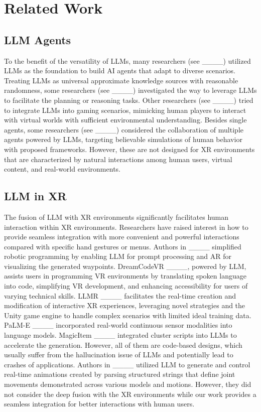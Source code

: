 \section{Related Work}
\label{sec:ref}
\subsection{LLM Agents}
To the benefit of the versatility of LLMs, many researchers (see ____) utilized LLMs as the foundation to build AI agents that adapt to diverse scenarios. Treating LLMs as universal approximate knowledge sources with reasonable randomness, some researchers (see ____) investigated the way to leverage LLMs to facilitate the planning or reasoning tasks. Other researchers (see ____) tried to integrate LLMs into gaming scenarios, mimicking human players to interact with virtual worlds with sufficient environmental understanding. 
Besides single agents, some researchers (see ____) considered the collaboration of multiple agents powered by LLMs, targeting believable simulations of human behavior with proposed frameworks.
However, these are not designed for XR environments that are characterized by natural interactions among human users, virtual content, and real-world environments.


\subsection{LLM in XR}
The fusion of LLM with XR environments significantly facilitates human interaction within XR environments. Researchers have raised interest in how to provide seamless integration with more convenient and powerful interactions compared with specific hand gestures or menus. Authors in ____ simplified robotic programming by enabling LLM for prompt processing and AR for visualizing the generated waypoints. DreamCodeVR ____, powered by LLM, assists users in programming VR environments by translating spoken language into code, simplifying VR development, and enhancing accessibility for users of varying technical skills. LLMR ____ facilitates the real-time creation and modification of interactive XR experiences, leveraging novel strategies and the Unity game engine to handle complex scenarios with limited ideal training data.  PaLM-E ____ incorporated real-world continuous sensor modalities into language models. MagicItem ____ integrated cluster scripts into LLMs to accelerate the generation. However, all of them are code-based designs, which usually suffer from the hallucination issue of LLMs and potentially lead to crashes of applications.
Authors in ____ utilized LLM to generate and control real-time animations created by parsing structured strings that define joint movements demonstrated across various models and motions. However, they did not consider the deep fusion with the XR environments while our work provides a seamless integration for better interactions with human users.


